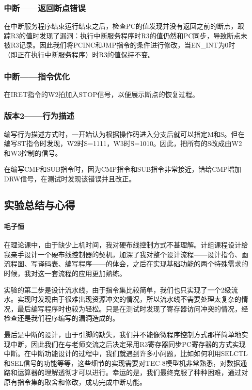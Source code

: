 \documentclass[lang=cn,11pt,a4paper,cite=authornum]{paper}
\begin{document}
\subsubsection{中断——返回断点错误}

在中断服务程序结束运行结束之后，检查PC的值发现并没有返回之前的断点，跟踪R3的值时发现了漏洞：执行中断服务程序时R3的值仍然和PC同步，导致断点未被R3记录。因此我们将PCINC和JMP指令的条件进行修改，当EN\_INT为0时（即正在执行中断服务程序）时R3的值保持不变。

\subsubsection{中断——指令优化}

在IRET指令的W2拍加入STOP信号，以便展示断点的恢复过程。

\subsubsection{版本2——行为描述}

编写行为描述方式时，一开始认为根据操作码进入分支后就可以指定M和S。但在编写ST指令时发现，W2时S=1111，W3时S=1010。因此，把所有的S改成由W2和W3控制的信号。

在编写CMP和SUB指令时，因为CMP指令和SUB指令非常接近，错给CMP增加DRW信号，在测试时发现该错误并且改正。

\subsection{实验总结与心得}


\paragraph{毛子恒}

在理论课中，由于缺少上机时间，我对硬布线控制方式不甚理解。计组课程设计给我亲手设计一个硬布线控制器的契机，加深了我对整个设计流程——设计指令、画流程图、写译码表、编写程序——的体会，之后在实现基础功能的两个特殊需求的时候，我对这一套流程的应用更加熟练。

实验的第二步是设计流水线，由于指令集比较简单，我们也只实现了一个2级流水。实现时发现由于很难出现资源冲突的情况，所以流水线不需要处理太复杂的情况，最后编写程序时也较为轻松。只是在测试时发现了寄存器访问冲突的情况，经检查还是我们程序编写的漏洞造成的。

最后是中断的设计，由于引脚的缺失，我们并不能像微程序控制方式那样简单地实现中断，因此我们在与老师交流之后决定采用R3寄存器同步PC寄存器的方式实现中断。在中断功能设计的过程中，我们就遇到许多小问题，比如如何利用SELCTL和SEL信号的功能等等，这些细节的实现需要对TEC-8模型机非常熟悉，对数据通路和运算器的理解透彻才可以进行。幸运的是，我们最终克服了种种困难，通过对原有指令集的取舍和修改，成功完成中断功能。
\end{document}
